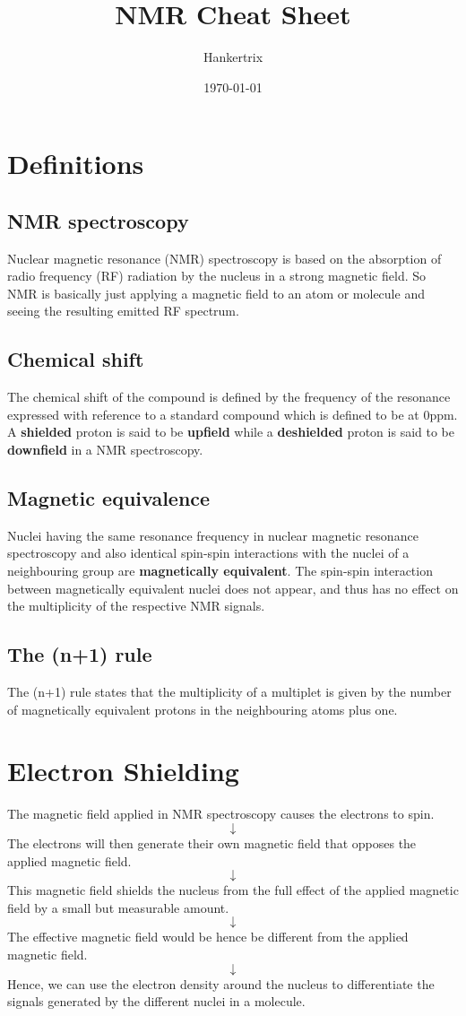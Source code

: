 \documentclass[11pt]{article}
\author{Hankertrix}
\date{\today}
\title{NMR Cheat Sheet}
\begin{document}
\maketitle
\setcounter{tocdepth}{2}
\tableofcontents \clearpage\section{Definitions}
\label{sec:orgaa66e1b}

\subsection{NMR spectroscopy}
\label{sec:orgb6280e8}
Nuclear magnetic resonance (NMR) spectroscopy is based on the absorption of radio frequency (RF) radiation by the nucleus in a strong magnetic field. So NMR is basically just applying a magnetic field to an atom or molecule and seeing the resulting emitted RF spectrum.
\subsection{Chemical shift}
\label{sec:orge521acc}
The chemical shift of the compound is defined by the frequency of the resonance expressed with reference to a standard compound which is defined to be at 0ppm. A \textbf{shielded} proton is said to be \textbf{upfield} while a \textbf{deshielded} proton is said to be \textbf{downfield} in a NMR spectroscopy.
\subsection{Magnetic equivalence}
\label{sec:orgeaf83c0}
Nuclei having the same resonance frequency in nuclear magnetic resonance spectroscopy and also identical spin-spin interactions with the nuclei of a neighbouring group are \textbf{magnetically equivalent}. The spin-spin interaction between magnetically equivalent nuclei does not appear, and thus has no effect on the multiplicity of the respective NMR signals.
\subsection{The (n+1) rule}
\label{sec:org940678d}
The (n+1) rule states that the multiplicity of a multiplet is given by the number of magnetically equivalent protons in the neighbouring atoms plus one.

\newpage
\section{Electron Shielding}
\label{sec:org8aee3e1}
The magnetic field applied in NMR spectroscopy causes the electrons to spin.
\[\downarrow\]
The electrons will then generate their own magnetic field that opposes the applied magnetic field.
\[\downarrow\]
This magnetic field shields the nucleus from the full effect of the applied magnetic field by a small but measurable amount.
\[\downarrow\]
The effective magnetic field would be hence be different from the applied magnetic field.
\[\downarrow\]
Hence, we can use the electron density around the nucleus to differentiate the signals generated by the different nuclei in a molecule.
\end{document}
